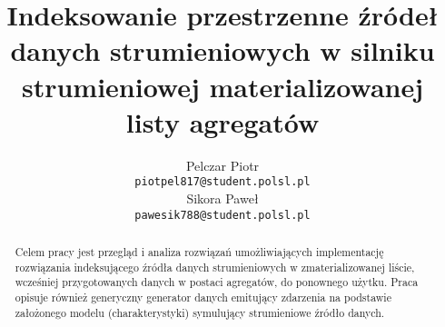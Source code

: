 \documentclass[12pt]{article}
\title{Indeksowanie przestrzenne źródeł danych strumieniowych w silniku strumieniowej materializowanej listy agregatów}
\author{
	  Pelczar Piotr\\
	  \small{\texttt{piotpel817@student.polsl.pl}}
	  \\[3ex]
	  Sikora Paweł\\
	  \small{\texttt{pawesik788@student.polsl.pl}}
	}
\date{\displaydate{date}}
\begin{document}
\maketitle
 
\begin{abstract}
Celem pracy jest przegląd i analiza rozwiązań umożliwiających implementację rozwiązania indeksującego źródła danych strumieniowych w zmaterializowanej liście, wcześniej przygotowanych danych w postaci agregatów, do ponownego użytku. Praca opisuje również generyczny generator danych emitujący zdarzenia na podstawie założonego modelu (charakterystyki) symulujący strumieniowe źródło danych.
\end{abstract}

\renewcommand{\contentsname}{Contents}

\newpage
\tableofcontents

\newpage










\end{document}
